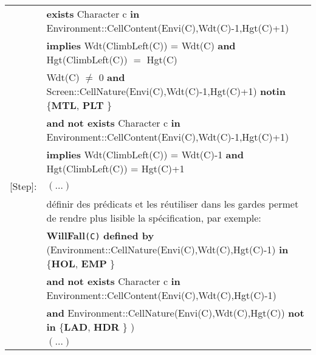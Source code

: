 \documentclass{article}
\begin{document}
\begin{tabular}{rl}
& \textbf{exists} \textrm{Character} c \textbf{in} \textrm{Environment::CellContent(Envi(C),Wdt(C)-1,Hgt(C)+1)} \\
& \quad\quad \textbf{implies} \textrm{Wdt(ClimbLeft(C))} = \textrm{Wdt(C)} \textbf{and} \textrm{Hgt(ClimbLeft(C))} $=$ \textrm{Hgt(C)} \\
& \textrm{Wdt(C)} $\neq$ 0 \textbf{and} \textrm{Screen::CellNature(Envi(C),Wdt(C)-1,Hgt(C)+1)} \textbf{notin} \{\textbf{MTL}, \textbf{PLT} \} \\
& \quad\quad \textbf{and} \textbf{not exists} \textrm{Character} c \textbf{in} \textrm{Environment::CellContent(Envi(C),Wdt(C)-1,Hgt(C)+1)} \\
& \quad\quad \textbf{implies} \textrm{Wdt(ClimbLeft(C))} = \textrm{Wdt(C)}-1 \textbf{and} \textrm{Hgt(ClimbLeft(C))} = \textrm{Hgt(C)}+1 \\
\textrm{[Step]}: & $(\dots)$ \\
& définir des prédicats et les réutiliser dans les gardes permet de rendre plus lisible la spécification, par exemple: \\
& \textbf{WillFall}\texttt{(C)} \textbf{defined by} (\textrm{Environment::CellNature(Envi(C),Wdt(C),Hgt(C)-1)} \textbf{in} \{\textbf{HOL}, \textbf{EMP} \}  \\
& \quad\quad\quad\quad\quad\quad\quad\quad\quad\quad \textbf{and} \textbf{not exists} \textrm{Character} c \textbf{in} \textrm{Environment::CellContent(Envi(C),Wdt(C),Hgt(C)-1)} \\
& \quad\quad\quad\quad\quad\quad\quad\quad\quad\quad \textbf{and} \textrm{Environment::CellNature(Envi(C),Wdt(C),Hgt(C))} \textbf{not in} \{\textbf{LAD}, \textbf{HDR} \} ) \\
& $(\dots)$
\end{tabular}
\end{document}
